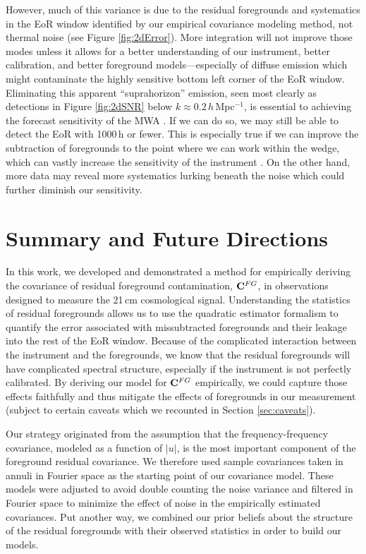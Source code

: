 However, much of this variance is due to the residual foregrounds and systematics in the EoR window identified by our empirical covariance modeling method, not thermal noise (see Figure \ref{fig:2dError}). More integration will not improve those modes unless it allows for a better understanding of our instrument, better calibration, and better foreground models---especially of diffuse emission which might contaminate the highly sensitive bottom left corner of the EoR window. Eliminating this apparent ``suprahorizon'' emission, seen most clearly as detections in Figure \ref{fig:2dSNR} below $k \approx 0.2$\,$h$\,Mpc$^{-1}$, is essential to achieving the forecast sensitivity of the MWA \cite{beardsley13}. If we can do so, we may still be able to detect the EoR with 1000\,h or fewer. This is especially true if we can improve the subtraction of foregrounds to the point where we can work within the wedge, which can vastly increase the sensitivity of the instrument \cite{beardsley13,PoberNextGen}. On the other hand, more data may reveal more systematics lurking beneath the noise which could further diminish our sensitivity.


\section{Summary and Future Directions} \label{sec:summary}

In this work, we developed and demonstrated a method for empirically deriving the covariance of residual foreground contamination, $\mathbf{C}^{FG}$, in observations designed to measure the 21\,cm cosmological signal. Understanding the statistics of residual foregrounds allows us to use the quadratic estimator formalism to quantify the error associated with missubtracted foregrounds and their leakage into the rest of the EoR window. Because of the complicated interaction between the instrument and the foregrounds, we know that the residual foregrounds will have complicated spectral structure, especially if the instrument is not perfectly calibrated. By deriving our model for $\mathbf{C}^{FG}$ empirically, we could capture those effects faithfully and thus mitigate the effects of foregrounds in our measurement (subject to certain caveats which we recounted in Section \ref{sec:caveats}).

Our strategy originated from the assumption that the frequency-frequency covariance, modeled as a function of $|u|$, is the most important component of the foreground residual covariance. We therefore used sample covariances taken in annuli in Fourier space as the starting point of our covariance model. These models were adjusted to avoid double counting the noise variance and filtered in Fourier space to minimize the effect of noise in the empirically estimated covariances. Put another way, we combined our prior beliefs about the structure of the residual foregrounds with their observed statistics in order to build our models.

